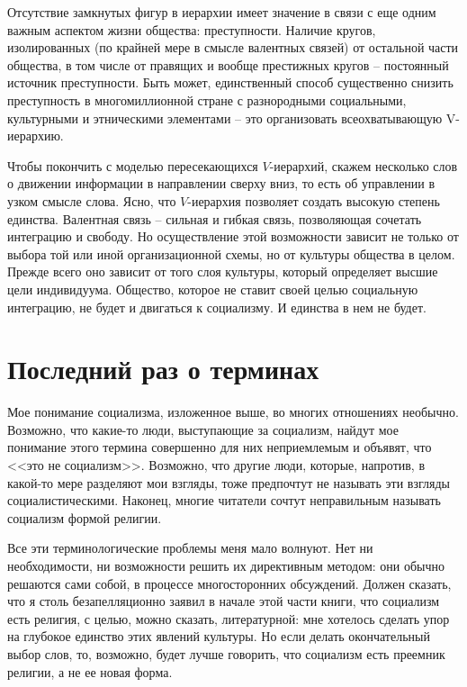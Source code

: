 \documentclass{book}
\begin{document}
Отсутствие замкнутых фигур в иерархии имеет значение в свя­зи с еще одним важным аспектом жизни общества: преступно­сти. Наличие кругов, изолированных (по крайней мере в смыс­ле валентных связей) от остальной части общества, в том числе от правящих и вообще престижных кругов -- постоянный источ­ник преступности. Быть может, единственный способ существен­но снизить преступность в многомиллионной стране с разнород­ными социальными, культурными и этническими элементами -- это организовать всеохватывающую V-  иерархию.

Чтобы покончить с моделью пересекающихся $V$-иерархий, скажем несколько слов о движении информации в направлении сверху вниз, то есть об управлении в узком смысле слова. Ясно, что $V$-иерархия позволяет создать высокую степень единства. Валентная связь -- сильная и гибкая связь, позволяющая соче­тать интеграцию и свободу. Но осуществление этой возможности зависит не только от выбора той или иной организационной схемы, но от культуры общества в целом. Прежде всего оно зависит от того слоя культуры, который определяет высшие цели индивидуума. Общество, которое не ставит своей целью социальную интеграцию, не будет и двигаться к социализму. И единства в нем не будет.


\section{Последний раз о терминах}

Мое понимание социализма, изложенное выше, во многих отношениях необычно. Возможно, что какие-то люди, выступаю­щие за социализм, найдут мое понимание этого термина совер­шенно для них неприемлемым и объявят, что <<это не социализм>>. Возможно, что другие люди, которые, напротив, в какой-то ме­ре разделяют мои взгляды, тоже предпочтут не называть эти взгляды социалистическими. Наконец, многие читатели сочтут неправильным называть социализм формой религии.

Все эти терминологические проблемы меня мало волнуют. Нет ни необходимости, ни возможности решить их директивным методом: они обычно решаются сами собой, в процессе много­сторонних обсуждений. Должен сказать, что я столь безапелля­ционно заявил в начале этой части книги, что социализм есть религия, с целью, можно сказать, литературной: мне хотелось сделать упор на глубокое единство этих явлений культуры. Но если делать окончательный выбор слов, то, возможно, будет лучше говорить, что социализм есть преемник религии, а не ее новая форма.
\end{document}
